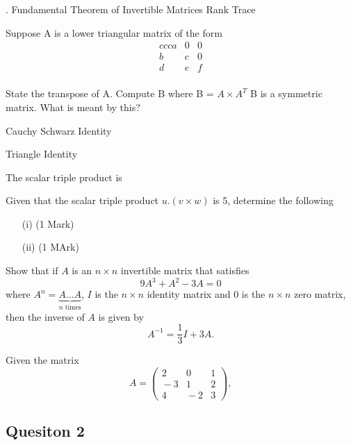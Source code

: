 \documentclass[12pt,a4paper]{article}
\def\marks#1{\hfill\rlap{~~~~~~~~~~~#1}}
\begin{document}

.
Fundamental Theorem of Invertible Matrices
Rank
Trace


Suppose A is a lower triangular matrix of the form 
\[
\begin{matrix}{ccc}
a & 0 & 0 \\
b & c & 0 \\
d & e & f \\
\end{matrix}
\]

State the transpose of A.
Compute B where B = $ A \times A^{T}$
B is a symmetric matrix. What is meant by this?


Cauchy Schwarz Identity

Triangle Identity


The scalar triple product is

Given that the scalar triple product $ u . (v \times w)$ is 5, determine the following
\begin{itemize}
\item[(i)] (1 Mark)
\item[(ii)] (1 MArk)
\end{itemize}

 Show that if $A$ is an $n\times n$ invertible matrix that satisfies 
 $$
 9A^3+A^2-3A=0
 $$
 where $A^n=\underbrace{A\ldots A}_{\textrm{$n$ times}}$, %
 $I$ is the $n\times n$  identity matrix and $0$ is the $n\times n$  zero matrix,
 then the inverse of $A$ is given by\marks{4}
 $$
 A^{-1}=\frac13I+3A.
 $$\vfill
 \item Given the matrix
 $$
 A=\left(\begin{array}{ccc} 2&0&1\\ \!\!\!-3&1&2\\ 4&\!\!\!-2&3\end{array}\right),
 $$
\subsection*{Quesiton 2}
\end{document}
